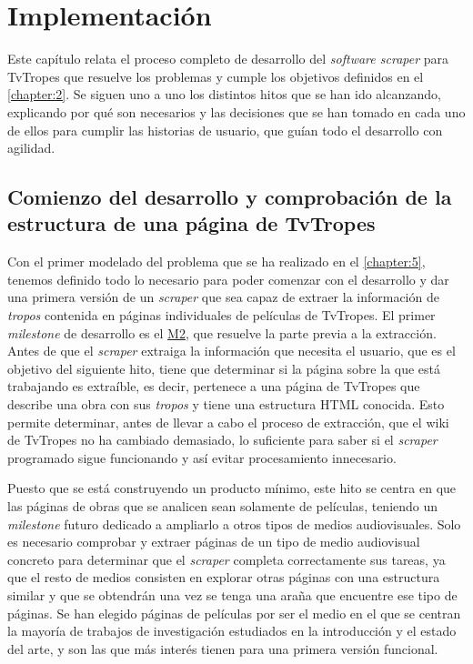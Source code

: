 \chapter{Implementación}
\label{chapter:6}

Este capítulo relata el proceso completo de desarrollo del \textit{software
scraper} para TvTropes que resuelve los problemas y cumple los objetivos
definidos en el \ref{chapter:2}. Se siguen uno a uno los distintos hitos que se
han ido alcanzando, explicando por qué son necesarios y las decisiones que se
han tomado en cada uno de ellos para cumplir las historias de usuario, que guían
todo el desarrollo con agilidad.

\section{Comienzo del desarrollo y comprobación de la estructura de una página de TvTropes}
Con el primer modelado del problema que se ha realizado en el \ref{chapter:5},
tenemos definido todo lo necesario para poder comenzar con el desarrollo y dar
una primera versión de un \textit{scraper} que sea capaz de extraer la
información de \textit{tropos} contenida en páginas individuales de películas de
TvTropes. El primer \textit{milestone} de desarrollo es el
\href{https://github.com/jlgallego99/TropesToGo/milestone/3}{M2}, que resuelve
la parte previa a la extracción. Antes de que el \textit{scraper} extraiga la
información que necesita el usuario, que es el objetivo del siguiente hito,
tiene que determinar si la página sobre la que está trabajando es extraíble, es
decir, pertenece a una página de TvTropes que describe una obra con sus
\textit{tropos} y tiene una estructura HTML conocida. Esto permite determinar,
antes de llevar a cabo el proceso de extracción, que el wiki de TvTropes no ha
cambiado demasiado, lo suficiente para saber si el \textit{scraper} programado
sigue funcionando y así evitar procesamiento innecesario. 

Puesto que se está construyendo un producto mínimo, este hito se centra en que
las páginas de obras que se analicen sean solamente de películas, teniendo un
\textit{milestone} futuro dedicado a ampliarlo a otros tipos de medios
audiovisuales. Solo es necesario comprobar y extraer páginas de un tipo de medio
audiovisual concreto para determinar que el \textit{scraper} completa
correctamente sus tareas, ya que el resto de medios consisten en explorar otras
páginas con una estructura similar y que se obtendrán una vez se tenga una araña
que encuentre ese tipo de páginas. Se han elegido páginas de películas por ser
el medio en el que se centran la mayoría de trabajos de investigación estudiados
en la introducción y el estado del arte, y son las que más interés tienen para
una primera versión funcional.

